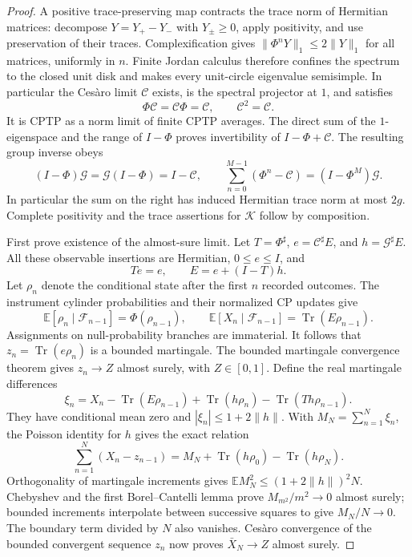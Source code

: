 \documentclass[12pt,a4paper]{article}
\begin{document}
\begin{proof}
A positive trace-preserving map contracts the trace norm of Hermitian
matrices: decompose $Y=Y_+-Y_-$ with $Y_\pm\ge0$, apply positivity,
and use preservation of their traces. Complexification gives
$\|\Phi^nY\|_1\le2\|Y\|_1$ for all matrices, uniformly in $n$.
Finite Jordan calculus therefore confines the spectrum to the closed
unit disk and makes every unit-circle eigenvalue semisimple. In
particular the Ces\`aro limit $\mathcal C$ exists, is the spectral
projector at $1$, and satisfies
\[
 \Phi\mathcal C=\mathcal C\Phi=\mathcal C,\qquad
 \mathcal C^2=\mathcal C.
\]
It is CPTP as a norm limit of finite CPTP averages. The direct sum of the
$1$-eigenspace and the range of $I-\Phi$ proves invertibility of
$I-\Phi+\mathcal C$. The resulting group inverse obeys
\begin{equation}
 (I-\Phi)\mathcal G=\mathcal G(I-\Phi)=I-\mathcal C,
 \qquad
 \sum_{n=0}^{M-1}(\Phi^n-\mathcal C)
 =(I-\Phi^M)\mathcal G.
 \label{p4:eq:v258-bounded-channel-partial-sums}
\end{equation}
In particular the sum on the right has induced Hermitian trace norm at
most $2g$. Complete positivity and the trace assertions for $\mathcal K$
follow by composition.

First prove existence of the almost-sure limit. Let
$T=\Phi^\sharp$, $e=\mathcal C^\sharp E$, and
$h=\mathcal G^\sharp E$. All these observable insertions are Hermitian,
$0\le e\le I$, and
\[
 Te=e,\qquad E=e+(I-T)h.
\]
Let $\rho_n$ denote the conditional state after the first $n$ recorded
outcomes. The instrument cylinder probabilities and their normalized CP
updates give
\[
 \mathbb E[\rho_n\mid\mathcal F_{n-1}]=\Phi(\rho_{n-1}),
 \qquad
 \mathbb E[X_n\mid\mathcal F_{n-1}]
       =\operatorname{Tr}(E\rho_{n-1}).
\]
Assignments on null-probability branches are immaterial. It follows that
$z_n=\operatorname{Tr}(e\rho_n)$ is a bounded martingale. The bounded
martingale convergence theorem gives $z_n\to Z$ almost surely, with
$Z\in[0,1]$. Define the real martingale differences
\[
 \xi_n=X_n-\operatorname{Tr}(E\rho_{n-1})
       +\operatorname{Tr}(h\rho_n)
       -\operatorname{Tr}(Th\rho_{n-1}).
\]
They have conditional mean zero and
$|\xi_n|\le1+2\|h\|$. With $M_N=\sum_{n=1}^N\xi_n$, the Poisson
identity for $h$ gives the exact relation
\begin{equation}
 \sum_{n=1}^N(X_n-z_{n-1})
 =M_N+\operatorname{Tr}(h\rho_0)-\operatorname{Tr}(h\rho_N).
 \label{p4:eq:v258-frequency-martingale-decomposition}
\end{equation}
Orthogonality of martingale increments gives
$\mathbb E M_N^2\le(1+2\|h\|)^2N$. Chebyshev and the first
Borel--Cantelli lemma prove $M_{m^2}/m^2\to0$ almost surely; bounded
increments interpolate between successive squares to give
$M_N/N\to0$. The boundary term divided by $N$ also vanishes.
Ces\`aro convergence of the bounded convergent sequence $z_n$ now proves
$\bar X_N\to Z$ almost surely.


\end{proof}
\end{document}
